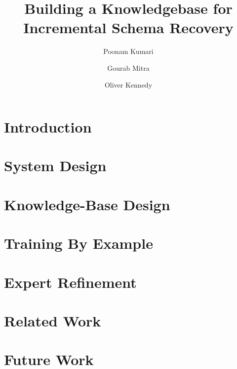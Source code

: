 \documentclass[sigconf]{acmart}
\begin{document}
\title{Building a Knowledgebase for Incremental Schema Recovery}


\author{Poonam Kumari}

\author{Gourab Mitra}

\author{Oliver Kennedy}


\renewcommand{\shortauthors}{Kumari et al.}


\begin{abstract}

\end{abstract}

%
%


\maketitle

\section{Introduction}
\label{sec:introduction}


\section{System Design}
\label{sec:system}


\section{Knowledge-Base Design}
\label{sec:knowledgebase}


\section{Training By Example}
\label{sec:trainbyexample}


\section{Expert Refinement}
\label{sec:expertui}


\section{Related Work}
\label{sec:related}
 

\section{Future Work}
\label{sec:future}




\end{document}
